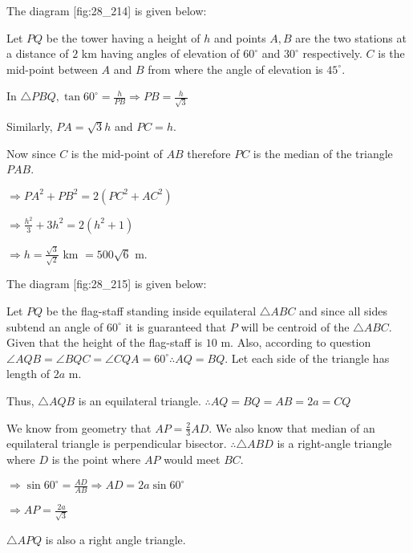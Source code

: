 \item The diagram [fig:28_214] is given below:

  \startplacefigure[reference=fig:28_214]
    \externalfigure[28_214.pdf]
  \stopplacefigure

  Let $PQ$ be the tower having a height of $h$ and points $A, B$ are the two stations
  at a distance of $2$ km having angles of elevation of $60^\circ$ and $30^\circ$
  respectively. $C$ is the mid-point between $A$ and $B$ from where the angle of
  elevation is $45^\circ$.

  In $\triangle PBQ, \tan60^\circ = \frac{h}{PB}\Rightarrow PB = \frac{h}{\sqrt{3}}$

  Similarly, $PA = \sqrt{3}h$ and $PC = h$.

  Now since $C$ is the mid-point of $AB$ therefore $PC$ is the median of the triangle
  $PAB$.

  $\Rightarrow PA^2 + PB^2 = 2(PC^2 + AC^2)$

  $\Rightarrow \frac{h^2}{3} + 3h^2 = 2(h^2 + 1)$

  $\Rightarrow h = \frac{\sqrt{3}}{\sqrt{2}}$ km $= 500\sqrt{6}$ m.

\item The diagram [fig:28_215] is given below:

  \startplacefigure[reference=fig:28_215]
    \externalfigure[28_215.pdf]
  \stopplacefigure

  Let $PQ$ be the flag-staff standing inside equilateral $\triangle ABC$ and since all sides
  subtend an angle of $60^\circ$ it is guaranteed that $P$ will be centroid of the
  $\triangle ABC$. Given that the height of the flag-staff is $10$ m. Also, according to
  question $\angle AQB = \angle BQC = \angle CQA = 60^\circ \therefore AQ = BQ$. Let each side of
  the triangle has length of $2a$ m.

  Thus, $\triangle AQB$ is an equilateral triangle. $\therefore AQ = BQ = AB = 2a = CQ$

  We know from geometry that $AP = \frac{2}{3}AD$. We also know that median of an equilateral
  triangle is perpendicular bisector. $\therefore \triangle ABD$ is a right-angle triangle where
  $D$ is the point where $AP$ would meet $BC$.

  $\Rightarrow \sin60^\circ = \frac{AD}{AB} \Rightarrow AD = 2a\sin60^\circ$

  $\Rightarrow AP = \frac{2a}{\sqrt{3}}$

  $\triangle APQ$ is also a right angle triangle.


